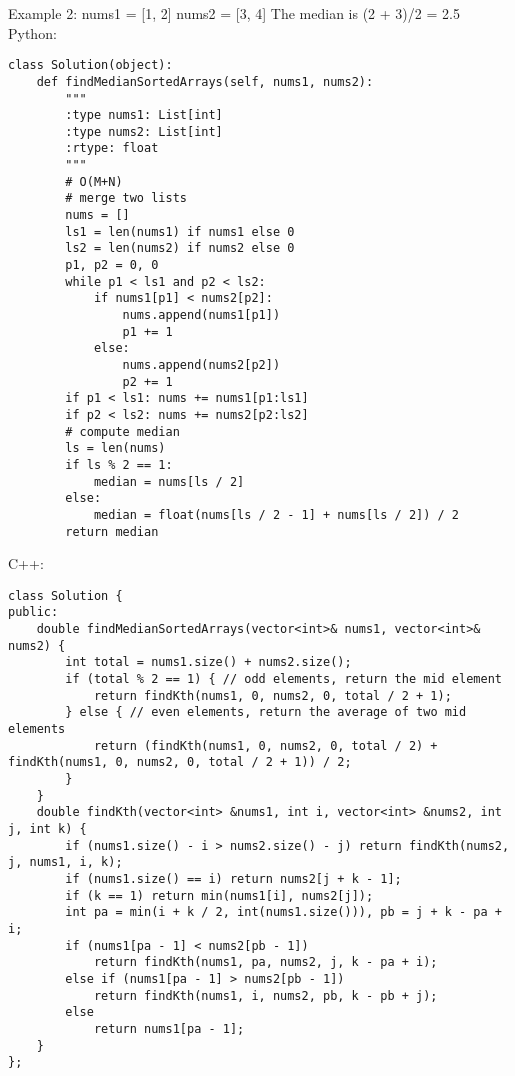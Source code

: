 Example 2:
nums1 = [1, 2]
nums2 = [3, 4]
The median is (2 + 3)/2 = 2.5\\

Python:
\lstset{language=python}
\begin{lstlisting}
class Solution(object):
    def findMedianSortedArrays(self, nums1, nums2):
        """
        :type nums1: List[int]
        :type nums2: List[int]
        :rtype: float
        """
        # O(M+N)
        # merge two lists
        nums = []
        ls1 = len(nums1) if nums1 else 0
        ls2 = len(nums2) if nums2 else 0
        p1, p2 = 0, 0
        while p1 < ls1 and p2 < ls2:
            if nums1[p1] < nums2[p2]:
                nums.append(nums1[p1])
                p1 += 1
            else:
                nums.append(nums2[p2])
                p2 += 1
        if p1 < ls1: nums += nums1[p1:ls1]
        if p2 < ls2: nums += nums2[p2:ls2]
        # compute median
        ls = len(nums)
        if ls % 2 == 1: 
            median = nums[ls / 2]
        else: 
            median = float(nums[ls / 2 - 1] + nums[ls / 2]) / 2
        return median
\end{lstlisting}        

C++:
\lstset{language=C++}
\begin{lstlisting}
class Solution {
public:
    double findMedianSortedArrays(vector<int>& nums1, vector<int>& nums2) {
        int total = nums1.size() + nums2.size();
        if (total % 2 == 1) { // odd elements, return the mid element
            return findKth(nums1, 0, nums2, 0, total / 2 + 1);
        } else { // even elements, return the average of two mid elements
            return (findKth(nums1, 0, nums2, 0, total / 2) + findKth(nums1, 0, nums2, 0, total / 2 + 1)) / 2;
        }
    }
    double findKth(vector<int> &nums1, int i, vector<int> &nums2, int j, int k) {
        if (nums1.size() - i > nums2.size() - j) return findKth(nums2, j, nums1, i, k);
        if (nums1.size() == i) return nums2[j + k - 1];
        if (k == 1) return min(nums1[i], nums2[j]);
        int pa = min(i + k / 2, int(nums1.size())), pb = j + k - pa + i;
        if (nums1[pa - 1] < nums2[pb - 1]) 
            return findKth(nums1, pa, nums2, j, k - pa + i);
        else if (nums1[pa - 1] > nums2[pb - 1]) 
            return findKth(nums1, i, nums2, pb, k - pb + j);
        else 
            return nums1[pa - 1];
    }
};
\end{lstlisting}


